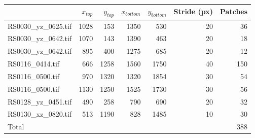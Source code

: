 \begin{tabular}{@{}lrrrrrr@{}}
\toprule
                        & $x_{top}$ & $y_{top}$ & $x_{bottom}$ & $y_{bottom}$ & Stride (px) & Patches \\ \midrule
RS0030\_yz\_0625.tif    & 1028      & 153       & 1350         & 530          & 20          & 36      \\
RS0030\_yz\_0642.tif    & 1070      & 143       & 1390         & 463          & 20          & 18      \\
RS0030\_yz\_0642.tif    & 895       & 400       & 1275         & 685          & 20          & 12      \\
RS0116\_0414.tif        & 666       & 1258      & 1560         & 1750         & 40          & 150     \\
RS0116\_0500.tif        & 970       & 1320      & 1320         & 1854         & 30          & 54      \\
RS0116\_0500.tif        & 1130      & 1250      & 1525         & 1730         & 30          & 56      \\
RS0128\_yz\_0451.tif    & 490       & 258       & 790          & 690          & 20          & 32      \\
RS0130\_xz\_0820.tif    & 513       & 1190      & 828          & 1485         & 10          & 30      \\ \midrule
Total                   &           &           &              &              &             & 388     \\ \bottomrule
\end{tabular}